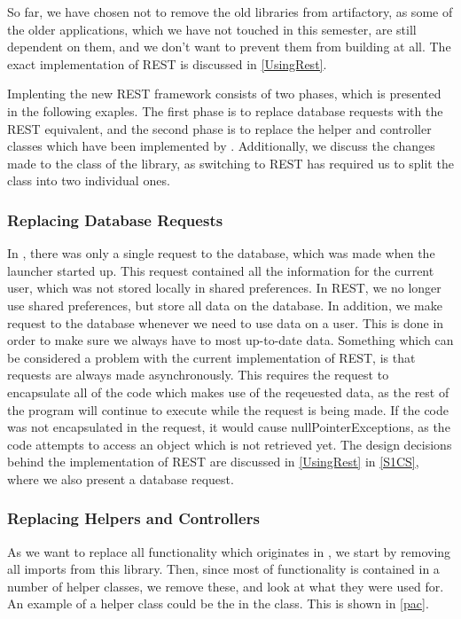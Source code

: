 So far, we have chosen not to remove the old libraries from artifactory, as some
of the older applications, which we have not touched in this semester, are still
dependent on them, and we don't want to prevent them from building at all. The
exact implementation of REST is discussed in \autoref{UsingRest}.\nl

Implenting the new REST framework consists of two phases, which is presented in
the following exaples. The first phase is to replace database requests with the
REST equivalent, and the second phase is to replace the helper and controller
classes which have been implemented by . Additionally, we discuss
the changes made to the  class of the
 library, as switching to REST has required us to split the
class into two individual ones.

\subsubsection{Replacing Database Requests}
In , there was only a single request to the database, which was
made when the launcher started up. This request contained all the information
for the current user, which was not stored locally in shared preferences. In
REST, we no longer use shared preferences, but store all data on the database.
In addition, we make request to the database whenever we need to use data on a
user. This is done in order to make sure we always have to most up-to-date data.
Something which can be considered a problem with the current implementation of
REST, is that requests are always made asynchronously.
This requires the request to encapsulate all of the code which makes use of the
reqeuested data, as the rest of the program will continue to execute while the
request is being made. If the code was not encapsulated in the request, it would
cause nullPointerExceptions, as the code attempts to access an object which is
not retrieved yet. The design decisions behind the implementation of REST are
discussed in \autoref{UsingRest} in \autoref{S1CS}, where we also present a
database request.

\subsubsection{Replacing Helpers and Controllers}
As we want to replace all functionality which originates
in , we start by removing all imports from this library. Then,
since most of  functionality is contained in a number of helper
classes, we remove these, and look at what they were used for. An example of a
helper class could be the  in the
 class. This is shown in \autoref{pac}.\nl

